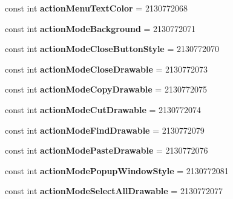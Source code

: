 \begin{DoxyCompactItemize}
const int {\bfseries action\+Menu\+Text\+Color} = 2130772068
\item 
\mbox{\label{classXaria_1_1Resource_1_1Attribute_a8861ddf602171fd8262f74daf8e2deda}} 
const int {\bfseries action\+Mode\+Background} = 2130772071
\item 
\mbox{\label{classXaria_1_1Resource_1_1Attribute_a824811aaf99982fba83a9e7554fca8c3}} 
const int {\bfseries action\+Mode\+Close\+Button\+Style} = 2130772070
\item 
\mbox{\label{classXaria_1_1Resource_1_1Attribute_a84fdf096d3f516b7cf50efc4bab2fc79}} 
const int {\bfseries action\+Mode\+Close\+Drawable} = 2130772073
\item 
\mbox{\label{classXaria_1_1Resource_1_1Attribute_af1c7d08ec43937ec2f2dcf706dfab140}} 
const int {\bfseries action\+Mode\+Copy\+Drawable} = 2130772075
\item 
\mbox{\label{classXaria_1_1Resource_1_1Attribute_a0ae5c47c636d823017bdc6ae068110b5}} 
const int {\bfseries action\+Mode\+Cut\+Drawable} = 2130772074
\item 
\mbox{\label{classXaria_1_1Resource_1_1Attribute_a463cdfdc7ed54959e3f7949e7b55a380}} 
const int {\bfseries action\+Mode\+Find\+Drawable} = 2130772079
\item 
\mbox{\label{classXaria_1_1Resource_1_1Attribute_a0e6b2f5d9183ddf6f411fe48407962d7}} 
const int {\bfseries action\+Mode\+Paste\+Drawable} = 2130772076
\item 
\mbox{\label{classXaria_1_1Resource_1_1Attribute_abb54c5c89212b2610930ca239e082acb}} 
const int {\bfseries action\+Mode\+Popup\+Window\+Style} = 2130772081
\item 
\mbox{\label{classXaria_1_1Resource_1_1Attribute_acc48212b1e3fb7254f52cab4d37b6571}} 
const int {\bfseries action\+Mode\+Select\+All\+Drawable} = 2130772077
\item 

\end{DoxyCompactItemize}

